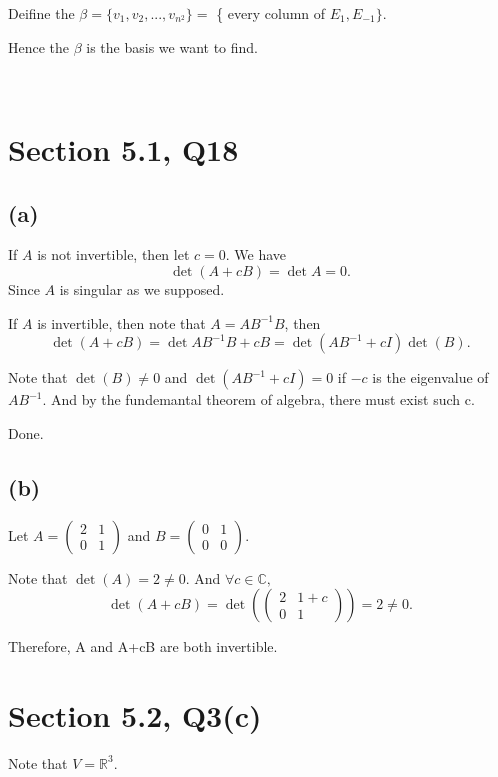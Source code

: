\documentclass[12pt]{article}%
\begin{document}
Deifine the $\beta = \{v_1,v_2,...,v_{n^2}\}=$ \{ every column of $ E_1, E_{-1}\}.$

Hence the $\beta$ is the basis we want to find.



~\ 

\section{Section 5.1, Q18}
\subsection{(a)}
If $A$ is not invertible, then let $c=0.$ We have $$\det{(A+cB)}=\det{A}=0.$$ Since $A$ is singular as we supposed.

If $A$ is invertible, then note that $A = AB^{-1}B$, then $$\det{(A+cB)}=\det{AB^{-1}B+cB}=\det{(AB^{-1}+cI)}\det{(B)}.$$

Note that $\det{(B)}\neq 0$ and $\det{(AB^{-1}+cI)}=0$ if $-c$ is the eigenvalue of $AB^{-1}$. And by the fundemantal theorem of algebra, there must exist such c.

Done.

\subsection{(b)}
Let $A=\begin{pmatrix}2&1\\0&1\end{pmatrix}$ and $B=\begin{pmatrix}0&1\\0&0\end{pmatrix}.$

Note that $\det{(A)}=2\neq 0.$ And $\forall c\in \mathbb{C},$ $$\det{(A+cB)}=\det{(\begin{pmatrix}2&1+c\\0&1\end{pmatrix})}=2\neq 0.$$

Therefore, A and A+cB are both invertible. 
~\ 





\section{Section 5.2, Q3(c)}

Note that $V=\mathbb{R}^3.$
\end{document}
